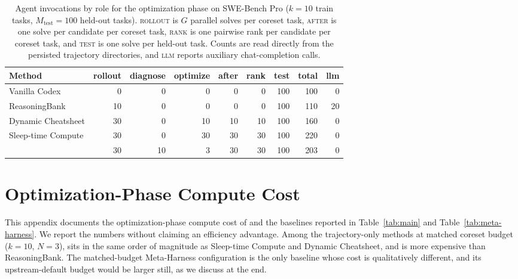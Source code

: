 \begin{table}[t]
\caption{Agent invocations by role for the optimization phase on SWE-Bench Pro ($k=10$ train tasks, $M_{\mathrm{test}}=100$ held-out tasks). \textsc{rollout} is $G$ parallel solves per coreset task, \textsc{after} is one solve per candidate per coreset task, \textsc{rank} is one pairwise rank per candidate per coreset task, and \textsc{test} is one solve per held-out task. Counts are read directly from the persisted trajectory directories, and \textsc{llm} reports auxiliary chat-completion calls.}
\label{tab:cost-breakdown}
\centering
\small
\begin{tabular}{lrrrrrrrr}
\toprule
\textbf{Method} & \textbf{rollout} & \textbf{diagnose} & \textbf{optimize} & \textbf{after} & \textbf{rank} & \textbf{test} & \textbf{total} & \textbf{llm} \\
\midrule
Vanilla Codex                              &   0 &  0 &  0 &  0 &  0 & 100 & 100 &  0 \\
ReasoningBank \citep{ouyang2026reasoningbank}   &  10 &  0 &  0 &  0 &  0 & 100 & 110 & 20 \\
Dynamic Cheatsheet \citep{suzgun2025dynamiccheatsheet} &  30 &  0 & 10 & 10 & 10 & 100 & 160 &  0 \\
Sleep-time Compute \citep{lin2025sleeptime}        &  30 &  0 & 30 & 30 & 30 & 100 & 220 &  0 \\
\method{}                            &  30 & 10 &  3 & 30 & 30 & 100 & 203 &  0 \\
\bottomrule
\end{tabular}
\end{table}

\section{Optimization-Phase Compute Cost}\label{app:cost}

This appendix documents the optimization-phase compute cost of \method{} and the baselines reported in Table~\ref{tab:main} and Table~\ref{tab:meta-harness}.
We report the numbers without claiming an efficiency advantage. Among the trajectory-only methods at matched coreset budget ($k=10$, $N=3$), \method{} sits in the same order of magnitude as Sleep-time Compute and Dynamic Cheatsheet, and is more expensive than ReasoningBank.
The matched-budget Meta-Harness configuration is the only baseline whose cost is qualitatively different, and its upstream-default budget would be larger still, as we discuss at the end.

